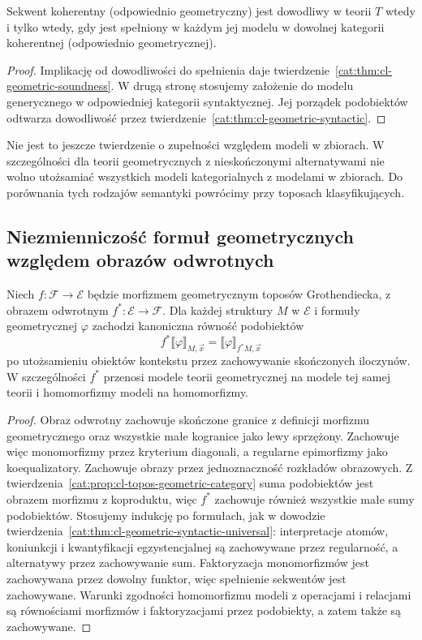 \begin{wniosek}\label{cat:cor:cl-geometric-completeness}
Sekwent koherentny (odpowiednio geometryczny) jest dowodliwy w teorii $T$ wtedy i tylko wtedy, gdy jest spełniony w każdym jej modelu w dowolnej kategorii koherentnej (odpowiednio geometrycznej).
\end{wniosek}
\begin{proof}
Implikację od dowodliwości do spełnienia daje twierdzenie~\ref{cat:thm:cl-geometric-soundness}. W drugą stronę stosujemy założenie do modelu generycznego w odpowiedniej kategorii syntaktycznej. Jej porządek podobiektów odtwarza dowodliwość przez twierdzenie~\ref{cat:thm:cl-geometric-syntactic}.
\end{proof}

Nie jest to jeszcze twierdzenie o zupełności względem modeli w zbiorach. W szczególności dla teorii geometrycznych z nieskończonymi alternatywami nie wolno utożsamiać wszystkich modeli kategorialnych z modelami w zbiorach. Do porównania tych rodzajów semantyki powrócimy przy toposach klasyfikujących.

\subsection{Niezmienniczość formuł geometrycznych względem obrazów odwrotnych}

\begin{twierdzenie}\label{cat:thm:cl-geometric-inverse-image}
Niech $f:\mathcal F\to\mathcal E$ będzie morfizmem geometrycznym toposów Grothendiecka, z obrazem odwrotnym $f^*:\mathcal E\to\mathcal F$. Dla każdej struktury $M$ w $\mathcal E$ i formuły geometrycznej $\varphi$ zachodzi kanoniczna równość podobiektów
\[
 f^*\llbracket\varphi\rrbracket_{M,\vec x}
 =\llbracket\varphi\rrbracket_{f^*M,\vec x}
\]
po utożsamieniu obiektów kontekstu przez zachowywanie skończonych iloczynów. W szczególności $f^*$ przenosi modele teorii geometrycznej na modele tej samej teorii i homomorfizmy modeli na homomorfizmy.
\end{twierdzenie}
\begin{proof}
Obraz odwrotny zachowuje skończone granice z definicji morfizmu geometrycznego oraz wszystkie małe kogranice jako lewy sprzężony. Zachowuje więc monomorfizmy przez kryterium diagonali, a regularne epimorfizmy jako koequalizatory. Zachowuje obrazy przez jednoznaczność rozkładów obrazowych. Z twierdzenia~\ref{cat:prop:cl-topos-geometric-category} suma podobiektów jest obrazem morfizmu z koproduktu, więc $f^*$ zachowuje również wszystkie małe sumy podobiektów. Stosujemy indukcję po formułach, jak w dowodzie twierdzenia~\ref{cat:thm:cl-geometric-syntactic-universal}: interpretacje atomów, koniunkcji i kwantyfikacji egzystencjalnej są zachowywane przez regularność, a alternatywy przez zachowywanie sum. Faktoryzacja monomorfizmów jest zachowywana przez dowolny funktor, więc spełnienie sekwentów jest zachowywane. Warunki zgodności homomorfizmu modeli z operacjami i relacjami są równościami morfizmów i faktoryzacjami przez podobiekty, a zatem także są zachowywane.
\end{proof}

